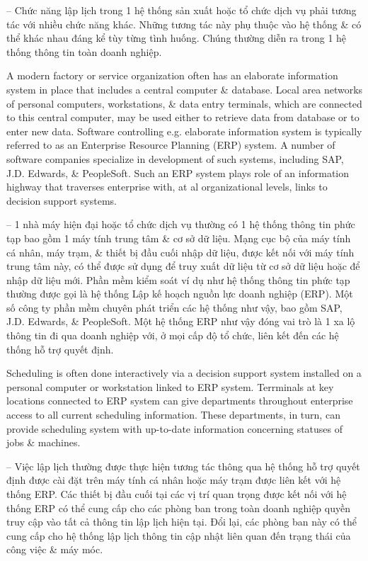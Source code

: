 \documentclass{article}
\begin{document}
\begin{itemize}
\begin{itemize}
        -- Chức năng lập lịch trong 1 hệ thống sản xuất hoặc tổ chức dịch vụ phải tương tác với nhiều chức năng khác. Những tương tác này phụ thuộc vào hệ thống \& có thể khác nhau đáng kể tùy từng tình huống. Chúng thường diễn ra trong 1 hệ thống thông tin toàn doanh nghiệp.
        
        A modern factory or service organization often has an elaborate information system in place that includes a central computer \& database. Local area networks of personal computers, workstations, \& data entry terminals, which are connected to this central computer, may be used either to retrieve data from database or to enter new data. Software controlling e.g. elaborate information system is typically referred to as an Enterprise Resource Planning (ERP) system. A number of software companies specialize in development of such systems, including SAP, J.D. Edwards, \& PeopleSoft. Such an ERP system plays role of an information highway that traverses enterprise with, at al organizational levels, links to decision support systems.
        
        -- 1 nhà máy hiện đại hoặc tổ chức dịch vụ thường có 1 hệ thống thông tin phức tạp bao gồm 1 máy tính trung tâm \& cơ sở dữ liệu. Mạng cục bộ của máy tính cá nhân, máy trạm, \& thiết bị đầu cuối nhập dữ liệu, được kết nối với máy tính trung tâm này, có thể được sử dụng để truy xuất dữ liệu từ cơ sở dữ liệu hoặc để nhập dữ liệu mới. Phần mềm kiểm soát ví dụ như hệ thống thông tin phức tạp thường được gọi là hệ thống Lập kế hoạch nguồn lực doanh nghiệp (ERP). Một số công ty phần mềm chuyên phát triển các hệ thống như vậy, bao gồm SAP, J.D. Edwards, \& PeopleSoft. Một hệ thống ERP như vậy đóng vai trò là 1 xa lộ thông tin đi qua doanh nghiệp với, ở mọi cấp độ tổ chức, liên kết đến các hệ thống hỗ trợ quyết định.
        
        Scheduling is often done interactively via a decision support system installed on a personal computer or workstation linked to ERP system. Terrminals at key locations connected to ERP system can give departments throughout enterprise access to all current scheduling information. These departments, in turn, can provide scheduling system with up-to-date information concerning statuses of jobs \& machines.
        
        -- Việc lập lịch thường được thực hiện tương tác thông qua hệ thống hỗ trợ quyết định được cài đặt trên máy tính cá nhân hoặc máy trạm được liên kết với hệ thống ERP. Các thiết bị đầu cuối tại các vị trí quan trọng được kết nối với hệ thống ERP có thể cung cấp cho các phòng ban trong toàn doanh nghiệp quyền truy cập vào tất cả thông tin lập lịch hiện tại. Đổi lại, các phòng ban này có thể cung cấp cho hệ thống lập lịch thông tin cập nhật liên quan đến trạng thái của công việc \& máy móc.
        

\end{itemize}
\end{itemize}
\end{document}
